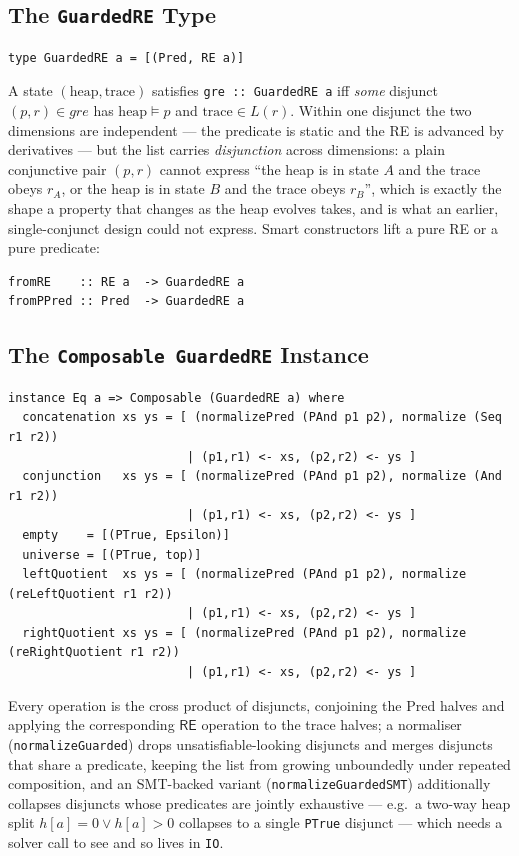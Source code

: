 \documentclass[acmsmall,screen]{acmart}
\newcommand{\RE}{\mathsf{RE}}
\begin{document}
\subsection{The \texttt{GuardedRE} Type}

\begin{lstlisting}
type GuardedRE a = [(Pred, RE a)]
\end{lstlisting}
A state $(\text{heap}, \text{trace})$ satisfies \lstinline{gre :: GuardedRE a}
iff \emph{some} disjunct $(p, r) \in \mathit{gre}$ has
$\text{heap} \models p$ and $\text{trace} \in L(r)$.
Within one disjunct the two dimensions are independent --- the predicate is
static and the RE is advanced by derivatives --- but the list carries
\emph{disjunction} across dimensions: a plain conjunctive pair $(p, r)$
cannot express ``the heap is in state $A$ and the trace obeys $r_A$, or the
heap is in state $B$ and the trace obeys $r_B$'', which is exactly the
shape a property that changes as the heap evolves takes, and is what an
earlier, single-conjunct design could not express.
Smart constructors lift a pure RE or a pure predicate:
\begin{lstlisting}
fromRE    :: RE a  -> GuardedRE a
fromPPred :: Pred  -> GuardedRE a
\end{lstlisting}

\subsection{The \texttt{Composable GuardedRE} Instance}

\begin{lstlisting}
instance Eq a => Composable (GuardedRE a) where
  concatenation xs ys = [ (normalizePred (PAnd p1 p2), normalize (Seq r1 r2))
                         | (p1,r1) <- xs, (p2,r2) <- ys ]
  conjunction   xs ys = [ (normalizePred (PAnd p1 p2), normalize (And r1 r2))
                         | (p1,r1) <- xs, (p2,r2) <- ys ]
  empty    = [(PTrue, Epsilon)]
  universe = [(PTrue, top)]
  leftQuotient  xs ys = [ (normalizePred (PAnd p1 p2), normalize (reLeftQuotient r1 r2))
                         | (p1,r1) <- xs, (p2,r2) <- ys ]
  rightQuotient xs ys = [ (normalizePred (PAnd p1 p2), normalize (reRightQuotient r1 r2))
                         | (p1,r1) <- xs, (p2,r2) <- ys ]
\end{lstlisting}
Every operation is the cross product of disjuncts, conjoining the Pred
halves and applying the corresponding $\RE$ operation to the trace halves;
a normaliser (\lstinline{normalizeGuarded}) drops unsatisfiable-looking
disjuncts and merges disjuncts that share a predicate, keeping the list
from growing unboundedly under repeated composition, and an SMT-backed
variant (\lstinline{normalizeGuardedSMT}) additionally collapses disjuncts
whose predicates are jointly exhaustive --- e.g.\ a two-way heap split
$h[a] = 0 \vee h[a] > 0$ collapses to a single \lstinline{PTrue} disjunct
--- which needs a solver call to see and so lives in \lstinline{IO}.
\end{document}
